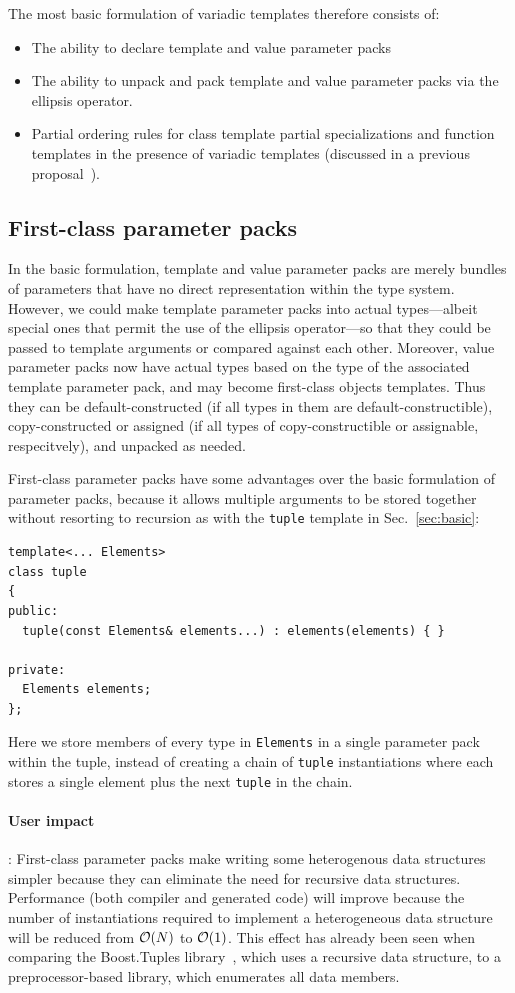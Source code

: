 \documentclass{article}
\begin{document}
The most basic formulation of variadic templates therefore consists
of:
\begin{itemize}
\item The ability to declare template and value parameter packs
\item The ability to unpack and pack template and value parameter
  packs via the ellipsis operator.
\item Partial ordering rules for class template partial
  specializations and function templates in the presence of variadic
  templates (discussed in a previous proposal~\cite{GJP04a}).
\end{itemize}

\subsection{First-class parameter packs}
\label{sec:first-class-pp}
In the basic formulation, template and value parameter packs are
merely bundles of parameters that have no direct representation within
the type system. However, we could make template parameter packs into
actual types---albeit special ones that permit the use of the ellipsis
operator---so that they could be passed to template arguments or
compared against each other. Moreover, value parameter packs now have
actual types based on the type of the associated template parameter
pack, and may become first-class objects templates. Thus they can be
default-constructed (if all types in them are default-constructible),
copy-constructed or assigned (if all types of copy-constructible or
assignable, respecitvely), and unpacked as needed. 

First-class parameter packs have some advantages over the basic
formulation of parameter packs, because it allows multiple arguments
to be stored together without resorting to recursion as with the
\texttt{tuple} template in Sec.~\ref{sec:basic}:
\begin{verbatim}
template<... Elements> 
class tuple
{
public:
  tuple(const Elements& elements...) : elements(elements) { }

private:
  Elements elements;
};
\end{verbatim}

Here we store members of every type in \texttt{Elements} in a single
parameter pack within the tuple, instead of creating a chain of
\texttt{tuple} instantiations where each stores a single element plus
the next \texttt{tuple} in the chain. 

\paragraph{User impact}: First-class parameter packs make writing some
heterogenous data structures simpler because they can eliminate the
need for recursive data structures. Performance (both compiler and
generated code) will improve because the number of instantiations
required to implement a heterogeneous data structure will be reduced
from ${\cal O}(N)$ to ${\cal O}(1)$. This effect has already been seen
when comparing the Boost.Tuples library~\cite{Tuples01}, which uses a
recursive data structure, to a preprocessor-based library, which
enumerates all data members. 
\end{document}
